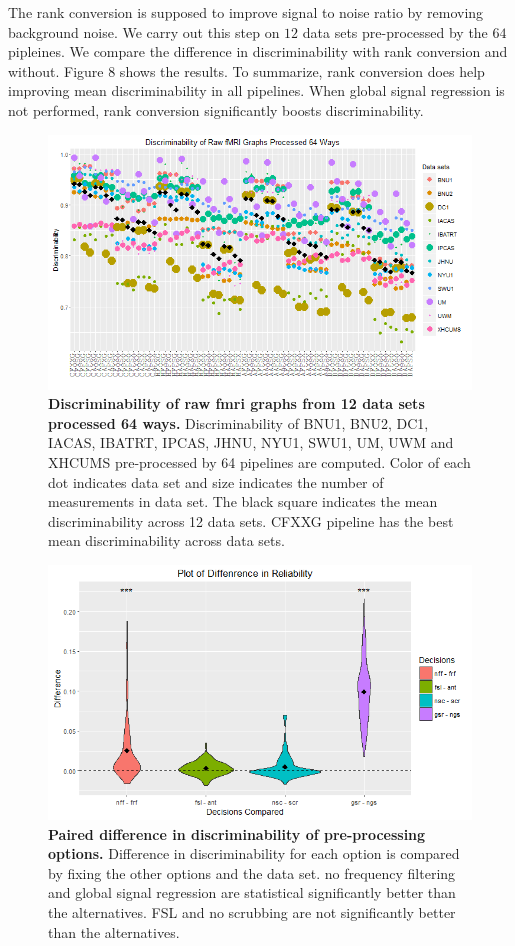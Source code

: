\documentclass{article}
\begin{document}
The rank conversion is supposed to improve signal to noise ratio by removing background noise. We carry out this step on $12$ data sets pre-processed by the $64$ pipleines. We compare the difference in discriminability with rank conversion and without. Figure 8 shows the results. To summarize, rank conversion does help improving mean discriminability in all pipelines. When global signal regression is not performed, rank conversion significantly boosts discriminability. 

\begin{figure}[ht!]
	\includegraphics[width=\linewidth]{../Figs/64_pipelines_raw.png}
	\caption{{\bf Discriminability of raw fmri graphs from 12 data sets processed 64 ways.}  Discriminability of BNU1, BNU2, DC1, IACAS, IBATRT, IPCAS, JHNU, NYU1, SWU1, UM, UWM and XHCUMS pre-processed by 64 pipelines are computed. Color of each dot indicates data set and size indicates the number of measurements in data set. The black square indicates the mean discriminability across 12 data sets. CFXXG pipeline has the best mean discriminability across data sets.}
	\label{fig:6}
\end{figure}

\begin{figure}[ht!]
	\includegraphics[width=\linewidth]{../Figs/Differ_violin_mean.png}
	\caption{{ \bf Paired difference in discriminability of pre-processing options.} Difference in discriminability for each option is compared by fixing the other options and the data set. no frequency filtering and global signal regression are statistical significantly better than the alternatives. FSL and no scrubbing are not significantly better than the alternatives.}
	\label{fig:7}
\end{figure}
\end{document}
